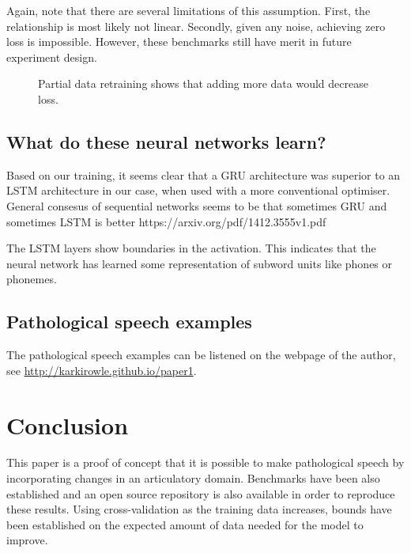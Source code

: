 \documentclass[a4paper]{article}
\begin{document}
Again, note that there are several limitations of this assumption. First, the
relationship is most likely not linear. Secondly, given any noise, achieving
zero loss is impossible. However, these benchmarks still have merit in
future experiment design.

\begin{figure}[t]
  \begin{center}
    \scalebox{0.50}{}
    \caption{Partial data retraining shows that adding more data would
      decrease loss. }
    \label{retraining_linear}
\end{center}
\end{figure}

\subsection{What do these neural networks learn?}

Based on our training, it seems clear that a GRU architecture was superior to an LSTM
architecture in our case, when used with a more conventional optimiser.
General consesus of sequential networks seems to be that sometimes GRU and sometimes LSTM is better
https://arxiv.org/pdf/1412.3555v1.pdf

The LSTM layers show boundaries in the activation. This indicates that the neural network
has learned some representation of subword units like phones or phonemes.
\subsection{Pathological speech examples}

The pathological speech examples can be listened on the webpage of the
author, see \url{http://karkirowle.github.io/paper1}. 

\section{Conclusion}

This paper is a proof of concept that it is possible to make pathological
speech by incorporating changes in an articulatory domain. Benchmarks
have been also established and an open source repository is also available
in order to reproduce these results. Using cross-validation as the
training data increases, bounds have been established on the expected
amount of data needed for the model to improve.
\end{document}
